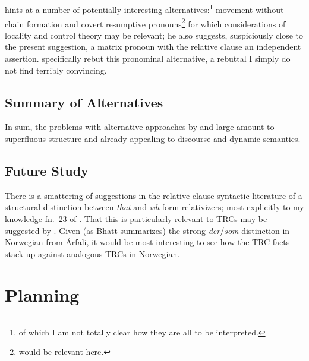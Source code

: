 \documentclass[11pt]{article}
\begin{document}
\subsection{\citet{vonfintelAmountRelativesMeaning1999}}
\citet{vonfintelAmountRelativesMeaning1999} hints at a number of potentially interesting alternatives:\footnote{of which I am not totally clear how they are all to be interpreted.} movement without chain formation and covert resumptive pronouns\footnote{\citet{postalContrastingExtractionTypes1994} would be relevant here.} for which considerations of locality and control theory may be relevant; he also suggests, suspiciously close to the present suggestion, a matrix pronoun with the relative clause an independent assertion. \citet{grosuAmountRelatives2017} specifically rebut this pronominal alternative, a rebuttal I simply do not find terribly convincing.

\subsection{Summary of Alternatives}

In sum, the problems with alternative approaches by and large amount to superfluous structure and already appealing to discourse and dynamic semantics.

\subsection{Future Study}

There is a smattering of suggestions in the relative clause syntactic literature of a structural distinction between \textit{that} and \textit{wh}-form relativizers; most explicitly to my knowledge fn.~23 of \citet{bhattRaisingAnalysisRelative2002}. That this is particularly relevant to TRCs may be suggested by \citet{kayThatVsWhich}. Given (as Bhatt summarizes) the strong \textit{der}/\textit{som} distinction in Norwegian from \AA{}rfali, it would be most interesting to see how the TRC facts stack up against analogous TRCs in Norwegian.

\section{Planning}
\end{document}
